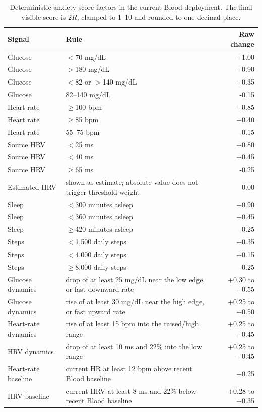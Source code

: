 \documentclass[12pt,letterpaper]{article}
\begin{document}
\begin{table}[H]
\centering
\small
\caption{Deterministic anxiety-score factors in the current Blood deployment. The final visible score is $2R$, clamped to 1--10 and rounded to one decimal place.}
\label{tab:score_rules}
\begin{tabular}{p{}p{}r}
\toprule
Signal & Rule & Raw change \\
\midrule
Glucose & $<$70 mg/dL & +1.00 \\
Glucose & $>$180 mg/dL & +0.90 \\
Glucose & $<$82 or $>$140 mg/dL & +0.35 \\
Glucose & 82--140 mg/dL & -0.15 \\
Heart rate & $\geq$100 bpm & +0.85 \\
Heart rate & $\geq$85 bpm & +0.40 \\
Heart rate & 55--75 bpm & -0.15 \\
Source HRV & $<$25 ms & +0.80 \\
Source HRV & $<$40 ms & +0.45 \\
Source HRV & $\geq$65 ms & -0.25 \\
Estimated HRV & shown as estimate; absolute value does not trigger threshold weight & 0.00 \\
Sleep & $<$300 minutes asleep & +0.90 \\
Sleep & $<$360 minutes asleep & +0.45 \\
Sleep & $\geq$420 minutes asleep & -0.25 \\
Steps & $<$1,500 daily steps & +0.35 \\
Steps & $<$4,000 daily steps & +0.15 \\
Steps & $\geq$8,000 daily steps & -0.25 \\
Glucose dynamics & drop of at least 25 mg/dL near the low edge, or fast downward rate & +0.30 to +0.55 \\
Glucose dynamics & rise of at least 30 mg/dL near the high edge, or fast upward rate & +0.25 to +0.50 \\
Heart-rate dynamics & rise of at least 15 bpm into the raised/high range & +0.25 to +0.45 \\
HRV dynamics & drop of at least 10 ms and 22\% into the low range & +0.25 to +0.45 \\
Heart-rate baseline & current HR at least 12 bpm above recent Blood baseline & +0.25 \\
HRV baseline & current HRV at least 8 ms and 22\% below recent Blood baseline & +0.28 to +0.35 \\
\bottomrule
\end{tabular}
\end{table}
\end{document}

